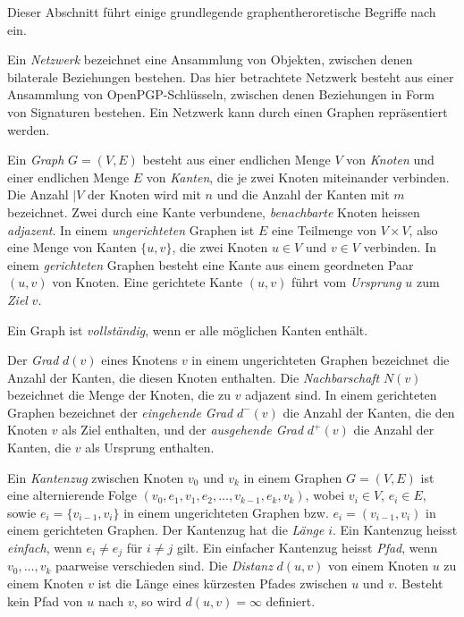 Dieser Abschnitt f\"uhrt einige grundlegende graphentheroretische
Begriffe nach \cite{Brandes2004} ein.
  
Ein \emph{Netzwerk} bezeichnet eine Ansammlung von Objekten, zwischen
denen bilaterale Beziehungen bestehen. Das hier betrachtete Netzwerk
besteht aus einer Ansammlung von OpenPGP-Schl\"usseln, zwischen denen
Beziehungen in Form von Signaturen bestehen. Ein Netzwerk kann durch einen
Graphen repr\"asentiert werden.

Ein \emph{Graph} $G=(V, E)$ besteht aus einer endlichen Menge $V$ von
\emph{Knoten} und einer endlichen Menge $E$ von \emph{Kanten}, die je
zwei Knoten miteinander verbinden. Die Anzahl $|V$ der Knoten wird mit
$n$ und die Anzahl der Kanten mit $m$ bezeichnet. Zwei durch eine
Kante verbundene, \emph{benachbarte} Knoten heissen
\emph{adjazent}. In einem \emph{ungerichteten} Graphen ist $E$ eine
Teilmenge von $V\times V$, also eine Menge von Kanten $\{u, v\}$, die
zwei Knoten $u \in V$ und $v\in V$ verbinden. In einem
\emph{gerichteten} Graphen besteht eine Kante aus einem geordneten
Paar $(u, v)$ von Knoten. Eine gerichtete Kante $(u, v)$ f\"uhrt vom
\emph{Ursprung} $u$ zum \emph{Ziel} $v$.

Ein Graph ist \emph{vollst\"andig}, wenn er alle m\"oglichen Kanten
enth\"alt.

Der \emph{Grad} $d(v)$ eines Knotens $v$ in einem ungerichteten
Graphen bezeichnet die Anzahl der Kanten, die diesen Knoten
enthalten. Die \emph{Nachbarschaft} $N(v)$ bezeichnet die Menge der
Knoten, die zu $v$ adjazent sind. In einem gerichteten Graphen
bezeichnet der \emph{eingehende Grad} $d^{-}(v)$ die Anzahl der
Kanten, die den Knoten $v$ als Ziel enthalten, und der
\emph{ausgehende Grad} $d^{+}(v)$ die Anzahl der Kanten, die $v$ als
Ursprung enthalten.

Ein \emph{Kantenzug} zwischen Knoten $v_0$ und $v_k$ in einem Graphen
$G=(V, E)$ ist eine alternierende Folge $(v_0, e_1, v_1, e_2, \dots,
v_{k-1}, e_k, v_k)$, wobei $v_i \in V$, $e_i \in E$, sowie $e_i =
\{v_{i-1}, v_{i}\}$ in einem ungerichteten Graphen bzw. $e_i =
(v_{i-1}, v_{i})$ in einem gerichteten Graphen. Der Kantenzug hat die
\emph{L\"ange} $i$. Ein Kantenzug heisst \emph{einfach}, wenn $e_i \ne
e_j$ f\"ur $i \ne j$ gilt.  Ein einfacher Kantenzug heisst
\emph{Pfad}, wenn $v_0, \dots, v_k$ paarweise verschieden sind. Die
\emph{Distanz} $d(u, v)$ von einem Knoten $u$ zu einem Knoten $v$ ist die
L\"ange eines k\"urzesten Pfades zwischen $u$ und $v$. Besteht kein
Pfad von $u$ nach $v$, so wird $d(u,v) = \infty$ definiert.


